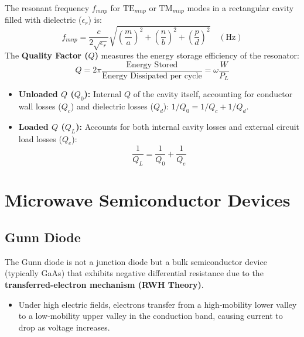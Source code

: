 \documentclass[12pt,a4paper]{article}
\begin{document}
\begin{tcolorbox}[formulabox, title={\textbf{Cavity Resonance \& Quality Factor}}]
The resonant frequency $f_{mnp}$ for $\text{TE}_{mnp}$ or $\text{TM}_{mnp}$ modes in a rectangular cavity filled with dielectric ($\epsilon_r$) is:
\begin{equation}
  f_{mnp} = \frac{c}{2\sqrt{\epsilon_r}} \sqrt{\left(\frac{m}{a}\right)^{\!2} + \left(\frac{n}{b}\right)^{\!2} + \left(\frac{p}{d}\right)^{\!2}} \quad (\text{Hz})
\end{equation}
The \textbf{Quality Factor ($Q$)} measures the energy storage efficiency of the resonator:
\begin{equation}
  Q = 2\pi \frac{\text{Energy Stored}}{\text{Energy Dissipated per cycle}} = \omega \frac{W}{P_L}
\end{equation}
\begin{itemize}[leftmargin=1.5em, itemsep=2pt, topsep=2pt]
  \item \textbf{Unloaded $Q$ ($Q_0$):} Internal $Q$ of the cavity itself, accounting for conductor wall losses ($Q_c$) and dielectric losses ($Q_d$): $1/Q_0 = 1/Q_c + 1/Q_d$.
  \item \textbf{Loaded $Q$ ($Q_L$):} Accounts for both internal cavity losses and external circuit load losses ($Q_e$):
    \begin{equation}
      \frac{1}{Q_L} = \frac{1}{Q_0} + \frac{1}{Q_e}
    \end{equation}
\end{itemize}
\end{tcolorbox}

\section{Microwave Semiconductor Devices}

\subsection{Gunn Diode}
The Gunn diode is not a junction diode but a bulk semiconductor device (typically GaAs) that exhibits negative differential resistance due to the \textbf{transferred-electron mechanism (RWH Theory)}.
\begin{itemize}[leftmargin=*, itemsep=3pt]
  \item Under high electric fields, electrons transfer from a high-mobility lower valley to a low-mobility upper valley in the conduction band, causing current to drop as voltage increases.
\end{itemize}
\end{document}
